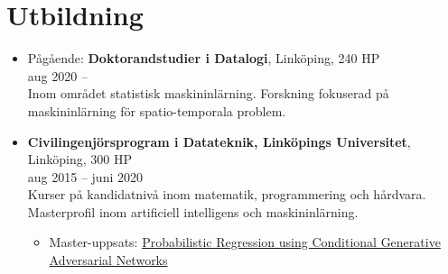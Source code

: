 \documentclass[12pt]{article}
\newcommand{\text}[2]{#2}
\newcommand{\text}[2]{#1}
\begin{document}
\section*{\text{Education}{Utbildning}}
\begin{itemize}
    \item \text{
            In progress: \textbf{Doctoral Studies in Computer Science, Linköping University}, Linköping, 240 ECTS\\
        Aug 2020 --
            \begin{itemize}
                   \item Part of the Division of Statistics and Machine Learning, Department of Computer and Information Science.
                   \item In my research I develop machine learning methods for data with spatial-, temporal- and graph-structure, including combinations of these. I am interested in how more traditional probabilistic methods in these domains can be combined with deep learning in order to derive new methods with useful properties.
                   \item I am an affiliated PhD Student in the \href{https://wasp-sweden.org/}{Wallenberg AI, Autonomous Systems and Software Program}
            \end{itemize}
        }{
            Pågående: \textbf{Doktorandstudier i Datalogi}, Linköping, 240 HP\\
            aug 2020 -- \\
            Inom området statistisk maskininlärning. Forskning fokuserad på maskininlärning för spatio-temporala problem.
        }
    \item \text{
            \textbf{Master programme in Computer Science and Engineering (Swedish Civilingenjörsprogram), Linköping University}, Linköping, 300 ECTS\\
        Aug 2015 -- June 2020\\
        }{
            \textbf{Civilingenjörsprogram i Datateknik, Linköpings Universitet}, \\ Linköping, 300 HP\\
        aug 2015 -- juni 2020\\
        }
        \text{
            Bachelor courses in mathematics, programming and electrical engineering. Master focused on machine learning, statistics and AI.
        }{
            Kurser på kandidatnivå inom matematik, programmering och hårdvara. Masterprofil inom artificiell intelligens och maskininlärning.
        }
        \begin{itemize}
            \item \text{
                    Master thesis: \href{http://urn.kb.se/resolve?urn=urn:nbn:se:liu:diva-166637}{Probabilistic Regression using Conditional Generative Adversarial Networks}
                }{
                    Master-uppsats: \href{http://urn.kb.se/resolve?urn=urn:nbn:se:liu:diva-166637}{Probabilistic Regression using Conditional Generative Adversarial Networks}
                }
        \end{itemize}


\end{itemize}
\end{document}
